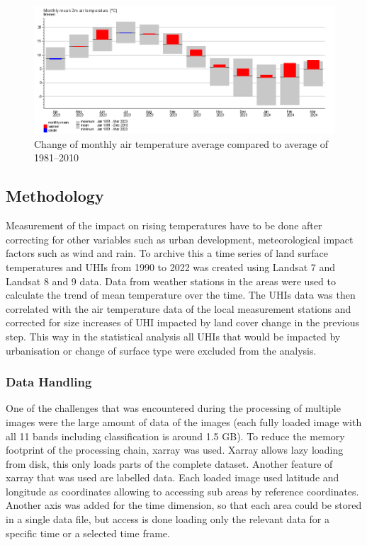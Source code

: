 \documentclass[12pt,a4paper, english,twoside]{scrartcl}
\begin{document}
      \begin{figure}[!htbp]
          \centering
          \includegraphics[width=\textwidth]{img/BremenClimateAvgDiff2023.png}
          \caption{Change of monthly air temperature average compared to average of 1981--2010~\autocite{DWD2024a}\label{fig:monthAvg}}
      \end{figure}
    \subsection{Methodology}
      Measurement of the impact on rising temperatures have to be done after correcting for other variables such as urban development, meteorological impact factors such as wind and rain. 
      To archive this a time series of land surface temperatures and \glspl{UHI} from 1990 to 2022 was created using Landsat 7 and Landsat 8 and 9 data.
      Data from weather stations in the areas were used to calculate the trend of mean temperature over the time. 
      The \glspl{UHI} data was then correlated with the air temperature data of the local measurement stations and corrected for size increases of \gls{UHI} impacted by land cover change in the previous step. 
      This way in the statistical analysis all \glspl{UHI} that would be impacted by urbanisation or change of surface type were excluded from the analysis.
    \subsubsection{Data Handling}
      One of the challenges that was encountered during the processing of multiple images were the large amount of data of the images (each fully loaded image with all 11 bands including classification is around 1.5 GB).
      To reduce the memory footprint of the processing chain, xarray \autocite{hoyer2017xarray} was used. 
      Xarray allows lazy loading from disk, this only loads parts of the complete dataset. 
      Another feature of xarray that was used are labelled data. Each loaded image used latitude and longitude as coordinates allowing to accessing sub areas by reference coordinates. 
      Another axis was added for the time dimension, so that each area could be stored in a single data file, but access is done loading only the relevant data for a specific time or a selected time frame.
  
\end{document}
